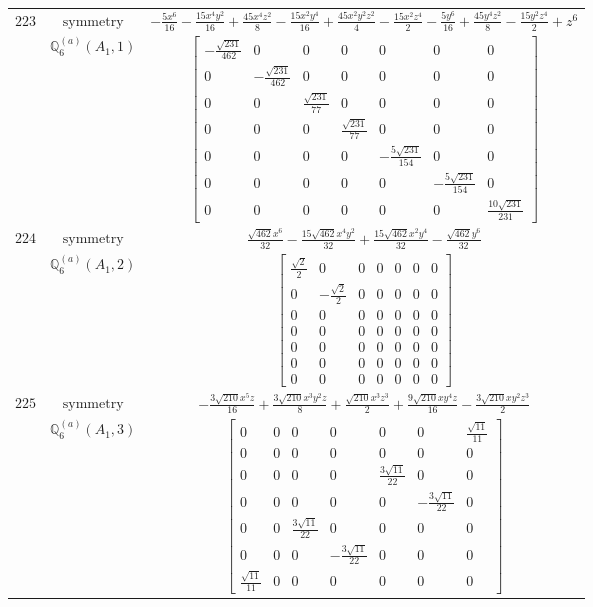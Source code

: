 \documentclass[fleqn,8pt,landscape]{jsarticle}
\begin{document}
\begin{longtable}{ccc}
$ 223 $ & $ \text{symmetry} $ & $ - \frac{5 x^{6}}{16} - \frac{15 x^{4} y^{2}}{16} + \frac{45 x^{4} z^{2}}{8} - \frac{15 x^{2} y^{4}}{16} + \frac{45 x^{2} y^{2} z^{2}}{4} - \frac{15 x^{2} z^{4}}{2} - \frac{5 y^{6}}{16} + \frac{45 y^{4} z^{2}}{8} - \frac{15 y^{2} z^{4}}{2} + z^{6} $ \\
$  $ & $ \mathbb{Q}_{6}^{(a)}(A_{1},1) $ & $ \begin{bmatrix} - \frac{\sqrt{231}}{462} & 0 & 0 & 0 & 0 & 0 & 0 \\ 0 & - \frac{\sqrt{231}}{462} & 0 & 0 & 0 & 0 & 0 \\ 0 & 0 & \frac{\sqrt{231}}{77} & 0 & 0 & 0 & 0 \\ 0 & 0 & 0 & \frac{\sqrt{231}}{77} & 0 & 0 & 0 \\ 0 & 0 & 0 & 0 & - \frac{5 \sqrt{231}}{154} & 0 & 0 \\ 0 & 0 & 0 & 0 & 0 & - \frac{5 \sqrt{231}}{154} & 0 \\ 0 & 0 & 0 & 0 & 0 & 0 & \frac{10 \sqrt{231}}{231} \end{bmatrix} $ \\ \hline
$ 224 $ & $ \text{symmetry} $ & $ \frac{\sqrt{462} x^{6}}{32} - \frac{15 \sqrt{462} x^{4} y^{2}}{32} + \frac{15 \sqrt{462} x^{2} y^{4}}{32} - \frac{\sqrt{462} y^{6}}{32} $ \\
$  $ & $ \mathbb{Q}_{6}^{(a)}(A_{1},2) $ & $ \begin{bmatrix} \frac{\sqrt{2}}{2} & 0 & 0 & 0 & 0 & 0 & 0 \\ 0 & - \frac{\sqrt{2}}{2} & 0 & 0 & 0 & 0 & 0 \\ 0 & 0 & 0 & 0 & 0 & 0 & 0 \\ 0 & 0 & 0 & 0 & 0 & 0 & 0 \\ 0 & 0 & 0 & 0 & 0 & 0 & 0 \\ 0 & 0 & 0 & 0 & 0 & 0 & 0 \\ 0 & 0 & 0 & 0 & 0 & 0 & 0 \end{bmatrix} $ \\ \hline
$ 225 $ & $ \text{symmetry} $ & $ - \frac{3 \sqrt{210} x^{5} z}{16} + \frac{3 \sqrt{210} x^{3} y^{2} z}{8} + \frac{\sqrt{210} x^{3} z^{3}}{2} + \frac{9 \sqrt{210} x y^{4} z}{16} - \frac{3 \sqrt{210} x y^{2} z^{3}}{2} $ \\
$  $ & $ \mathbb{Q}_{6}^{(a)}(A_{1},3) $ & $ \begin{bmatrix} 0 & 0 & 0 & 0 & 0 & 0 & \frac{\sqrt{11}}{11} \\ 0 & 0 & 0 & 0 & 0 & 0 & 0 \\ 0 & 0 & 0 & 0 & \frac{3 \sqrt{11}}{22} & 0 & 0 \\ 0 & 0 & 0 & 0 & 0 & - \frac{3 \sqrt{11}}{22} & 0 \\ 0 & 0 & \frac{3 \sqrt{11}}{22} & 0 & 0 & 0 & 0 \\ 0 & 0 & 0 & - \frac{3 \sqrt{11}}{22} & 0 & 0 & 0 \\ \frac{\sqrt{11}}{11} & 0 & 0 & 0 & 0 & 0 & 0 \end{bmatrix} $ \\ \hline

\end{longtable}
\end{document}
